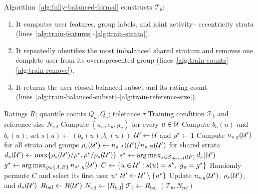 \documentclass[11pt]{article}
\begin{document}
Algorithm~\ref{alg:fully-balanced-formal} constructs $\mathcal T_b$:
\begin{enumerate}
    \item It computes user features, group labels, and joint activity--
    eccentricity strata (lines~\ref{alg:train-features}--\ref{alg:train-strata}).
    \item It repeatedly identifies the most imbalanced shared stratum and
    removes one complete user from its overrepresented group
    (lines~\ref{alg:train-counts}--\ref{alg:train-remove}).
    \item It returns the user-closed balanced subset and its rating count
    (lines~\ref{alg:train-balanced-subset}--\ref{alg:train-reference-size}).
\end{enumerate}

\begin{algorithm}[H]
\caption{Construction of the fully balanced training subset}
\label{alg:fully-balanced-formal}
\begin{algorithmic}[1]
\Require Ratings $R$; quantile counts $Q_a,Q_e$; tolerance $\tau$
\Ensure Training condition $\mathcal T_b$ and reference size $N_{\mathrm{ref}}$
\State Compute $(a_u,e_u,g_u)$ for every $u\in{\cal U}$
    \label{alg:train-features}
\State Compute $b_a(u)$ and $b_e(u)$; set $s(u)\gets(b_a(u),b_e(u))$
    \label{alg:train-strata}
\State ${\cal U}'\gets{\cal U}$ and $\rho^\star\gets1$
    \label{alg:train-initialize}
\State Compute $n_{s,g}({\cal U}')$ for all strata and groups
    \label{alg:train-counts}
\State $\rho_s({\cal U}')\gets n_{s,A}({\cal U}')/n_{s,B}({\cal U}')$
    for shared strata
\State $d_s({\cal U}')\gets\max\{\rho_s({\cal U}')/\rho^\star,
    \rho^\star/\rho_s({\cal U}')\}$
    \State $s^\star\gets\arg\max_{s\in{\cal S}_{\mathrm{shared}}({\cal U}')}d_s({\cal U}')$
    \State $g^\star\gets\arg\max_{g\in\{A,B\}}n_{s^\star,g}({\cal U}')$
    \State $C\gets\{u\in{\cal U}':s(u)=s^\star,\ g_u=g^\star\}$
    \State Randomly permute $C$ and select its first user $u^\star$
        \label{alg:train-remove}
    \State ${\cal U}'\gets{\cal U}'\setminus\{u^\star\}$
    \State Update $n_{s,g}({\cal U}')$, $\rho_s({\cal U}')$, and
        $d_s({\cal U}')$
\EndWhile
\State $R_{\mathrm{bal}}\gets R({\cal U}')$
    \label{alg:train-balanced-subset}
\State $N_{\mathrm{ref}}\gets|R_{\mathrm{bal}}|$
    \label{alg:train-reference-size}
\State $\mathcal T_b\gets R_{\mathrm{bal}}$
\State \Return $(\mathcal T_b,N_{\mathrm{ref}})$
\end{algorithmic}
\end{algorithm}
\end{document}
